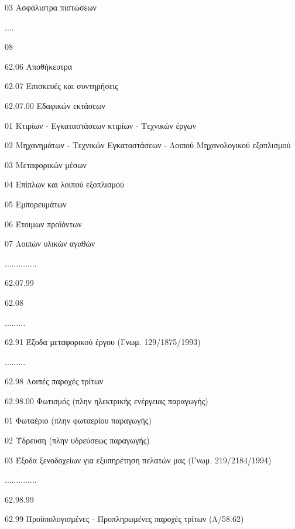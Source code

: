 \documentclass[A4,10pt,greek]{book}
\begin{document}
                                03   Ασφάλιστρα πιστώσεων

                                ....

                                08

        62.06   Αποθήκευτρα

        62.07   Επισκευές και συντηρήσεις

                    62.07.00   Εδαφικών εκτάσεων

                                01   Κτιρίων - Εγκαταστάσεων κτιρίων - Τεχνικών έργων

                                02   Μηχανημάτων - Τεχνικών Εγκαταστάσεων - Λοιπού
                                        Μηχανολογικού εξοπλισμού

                                03   Μεταφορικών μέσων

                                04   Επίπλων και λοιπού εξοπλισμού

                                05   Εμπορευμάτων

                                06   Έτοιμων προϊόντων

                                07   Λοιπών υλικών αγαθών

                    ..............

                    62.07.99

        62.08

        .........

        62.91   Έξοδα μεταφορικού έργου (Γνωμ. 129/1875/1993)

        .........

        62.98   Λοιπές παροχές τρίτων

                    62.98.00    Φωτισμός (πλην ηλεκτρικής ενέργειας παραγωγής)

                                01   Φωταέριο (πλην φωταερίου παραγωγής)

                                02   Ύδρευση (πλην υδρεύσεως παραγωγής)

                                03   Έξοδα ξενοδοχείων για εξυπηρέτηση πελατών μας
                                        (Γνωμ. 219/2184/1994)

                    ..............

                    62.98.99

        62.99   Προϋπολογισμένες - Προπληρωμένες παροχές τρίτων (Λ/58.62)

 
\end{document}
